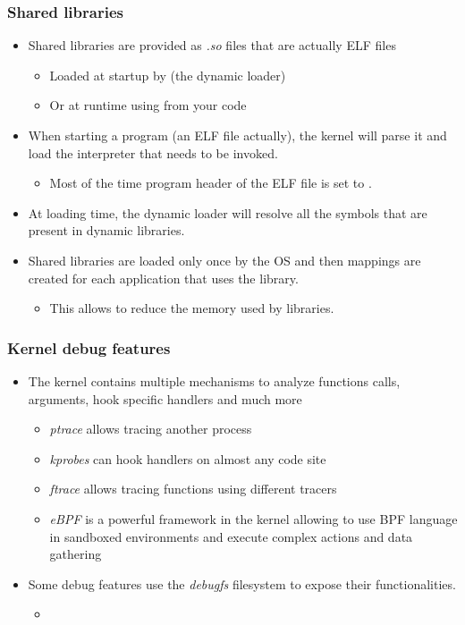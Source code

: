 \begin{frame}
  \frametitle{Shared libraries}
  \begin{itemize}
    \item Shared libraries are provided as {\em .so} files that are actually ELF files
    \begin{itemize}
      \item Loaded at startup by  (the dynamic loader)
      \item Or at runtime using  from your code
    \end{itemize}
    \item When starting a program (an ELF file actually), the kernel will
          parse it and load the interpreter that needs to be invoked.
    \begin{itemize}
      \item Most of the time  program header of the ELF file is
            set to .
    \end{itemize}
    \item At loading time, the dynamic loader  will resolve all the
          symbols that are present in dynamic libraries.
    \item Shared libraries are loaded only once by the OS and then mappings are
          created for each application that uses the library.
    \begin{itemize}
      \item This allows to reduce the memory used by libraries.
    \end{itemize}
  \end{itemize}
\end{frame}

\begin{frame}
  \frametitle{Kernel debug features}
  \begin{itemize}
    \item The kernel contains multiple mechanisms to analyze functions calls,
          arguments, hook specific handlers and much more
    \begin{itemize}
      \item {\em ptrace} allows tracing another process
      \item {\em kprobes} can hook handlers on almost any code site
      \item {\em ftrace} allows tracing functions using different tracers
      \item {\em eBPF} is a powerful framework in the kernel allowing to use BPF
            language in sandboxed environments and execute complex actions and
            data gathering
    \end{itemize}
    \item Some debug features use the {\em debugfs} filesystem to expose their
          functionalities.
    \begin{itemize}
      \item {}
    \end{itemize}
  \end{itemize}
\end{frame}

